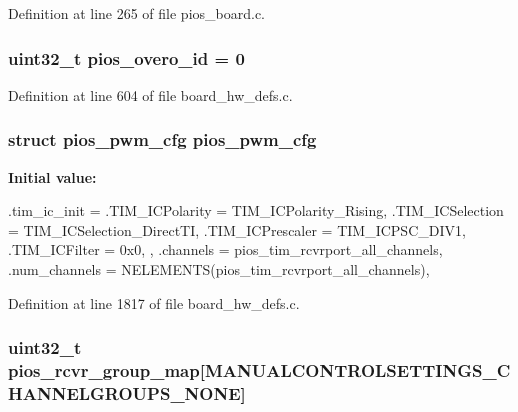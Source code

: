 \-Definition at line 265 of file pios\-\_\-board.\-c.

\hypertarget{group___revolution_ga6068626ce5d15d09ba077204ea2fd43d}{
\subsubsection[{pios\-\_\-overo\-\_\-id}]{\setlength{\rightskip}{0pt plus 5cm}uint32\-\_\-t {\bf pios\-\_\-overo\-\_\-id} = 0}}\label{group___revolution_ga6068626ce5d15d09ba077204ea2fd43d}


\-Definition at line 604 of file board\-\_\-hw\-\_\-defs.\-c.

\hypertarget{group___revolution_ga7587f8e174df90bef8cec1edfa9e14c1}{
\subsubsection[{pios\-\_\-pwm\-\_\-cfg}]{\setlength{\rightskip}{0pt plus 5cm}struct {\bf pios\-\_\-pwm\-\_\-cfg} {\bf pios\-\_\-pwm\-\_\-cfg}}}\label{group___revolution_ga7587f8e174df90bef8cec1edfa9e14c1}
{\bfseries \-Initial value\-:}
\begin{DoxyCode}
 {
        .tim_ic_init = {
                .TIM_ICPolarity = TIM_ICPolarity_Rising,
                .TIM_ICSelection = TIM_ICSelection_DirectTI,
                .TIM_ICPrescaler = TIM_ICPSC_DIV1,
                .TIM_ICFilter = 0x0,
        },
        .channels = pios_tim_rcvrport_all_channels,
        .num_channels = NELEMENTS(pios_tim_rcvrport_all_channels),
}
\end{DoxyCode}


\-Definition at line 1817 of file board\-\_\-hw\-\_\-defs.\-c.

\hypertarget{group___revolution_ga6c6cfc16eb738e47c123298e062297e2}{
\subsubsection[{pios\-\_\-rcvr\-\_\-group\-\_\-map}]{\setlength{\rightskip}{0pt plus 5cm}uint32\-\_\-t {\bf pios\-\_\-rcvr\-\_\-group\-\_\-map}\mbox{[}{\bf \-M\-A\-N\-U\-A\-L\-C\-O\-N\-T\-R\-O\-L\-S\-E\-T\-T\-I\-N\-G\-S\-\_\-\-C\-H\-A\-N\-N\-E\-L\-G\-R\-O\-U\-P\-S\-\_\-\-N\-O\-N\-E}\mbox{]}}}\label{group___revolution_ga6c6cfc16eb738e47c123298e062297e2}


